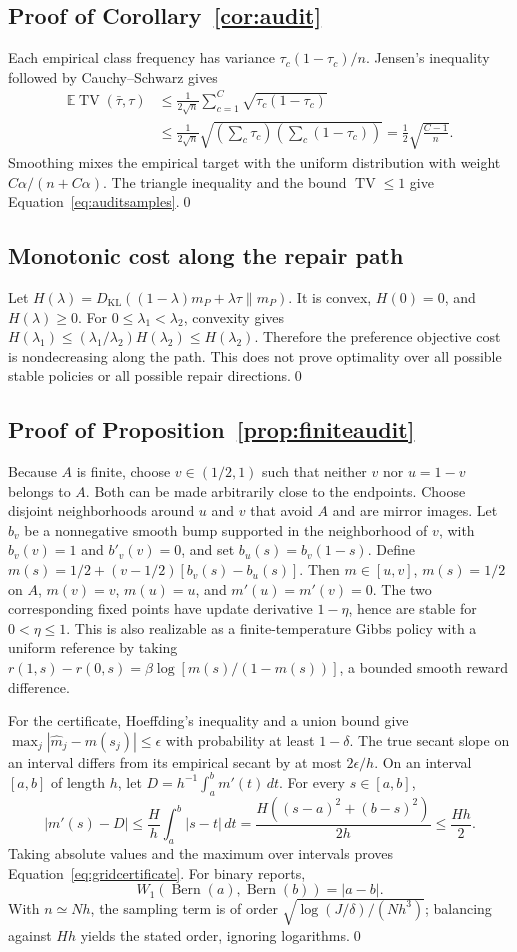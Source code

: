 \documentclass[10pt]{article}
\newcommand{\E}{\mathbb E}
\newcommand{\KL}{D_{\mathrm{KL}}}
\newcommand{\TV}{\operatorname{TV}}
\begin{document}
\subsection{Proof of Corollary~\ref{cor:audit}}
Each empirical class frequency has variance $\tau_c(1-\tau_c)/n$.
Jensen's inequality followed by Cauchy--Schwarz gives
\begin{align}
 \E\TV(\bar\tau,\tau)
 &\le\frac{1}{2\sqrt n}\sum_{c=1}^C\sqrt{\tau_c(1-\tau_c)}\\
 &\le\frac{1}{2\sqrt n}
       \sqrt{\left(\sum_c\tau_c\right)\left(\sum_c(1-\tau_c)\right)}
 =\frac12\sqrt{\frac{C-1}{n}}.
\end{align}
Smoothing mixes the empirical target with the uniform distribution with
weight $C\alpha/(n+C\alpha)$. The triangle inequality and the bound
$\TV\le1$ give Equation~\eqref{eq:auditsamples}.\qed

\subsection{Monotonic cost along the repair path}
Let $H(\lambda)=\KL((1-\lambda)m_P+\lambda\tau\|m_P)$.
It is convex, $H(0)=0$, and $H(\lambda)\ge0$. For
$0\le\lambda_1<\lambda_2$, convexity gives
$H(\lambda_1)\le(\lambda_1/\lambda_2)H(\lambda_2)\le H(\lambda_2)$.
Therefore the preference objective cost is nondecreasing along the path.
This does not prove optimality over all possible stable policies or all
possible repair directions.\qed

\subsection{Proof of Proposition~\ref{prop:finiteaudit}}
Because $A$ is finite, choose $v\in(1/2,1)$ such that neither $v$ nor
$u=1-v$ belongs to $A$. Both can be made arbitrarily close to the endpoints.
Choose disjoint neighborhoods around $u$ and $v$ that avoid $A$ and are
mirror images. Let $b_v$ be a nonnegative smooth bump supported in the
neighborhood of $v$, with $b_v(v)=1$ and $b'_v(v)=0$, and set
$b_u(s)=b_v(1-s)$. Define
$m(s)=1/2+(v-1/2)[b_v(s)-b_u(s)]$. Then $m\in[u,v]$,
$m(s)=1/2$ on $A$, $m(v)=v$, $m(u)=u$, and $m'(u)=m'(v)=0$.
The two corresponding fixed points have update derivative $1-\eta$, hence
are stable for $0<\eta\le1$. This is also realizable as a finite-temperature
Gibbs policy with a uniform reference by taking
$r(1,s)-r(0,s)=\beta\log[m(s)/(1-m(s))]$, a bounded smooth reward difference.

For the certificate, Hoeffding's inequality and a union bound give
$\max_j|\widehat m_j-m(s_j)|\le\epsilon$ with probability at least
$1-\delta$. The true secant slope on an interval differs from its empirical secant by
at most $2\epsilon/h$. On an interval $[a,b]$ of length $h$, let
$D=h^{-1}\int_a^b m'(t)\,dt$. For every $s\in[a,b]$,
\[
 |m'(s)-D|\le\frac{H}{h}\int_a^b|s-t|\,dt
 =\frac{H((s-a)^2+(b-s)^2)}{2h}\le\frac{Hh}{2}.
\]
Taking absolute values and the maximum over intervals proves
Equation~\eqref{eq:gridcertificate}. For binary
reports,\[W_1(\operatorname{Bern}(a),\operatorname{Bern}(b))=|a-b|.\]
With $n\simeq Nh$, the sampling term is of order
$\sqrt{\log(J/\delta)/(Nh^3)}$; balancing against $Hh$ yields the stated
order, ignoring logarithms.\qed
\end{document}
